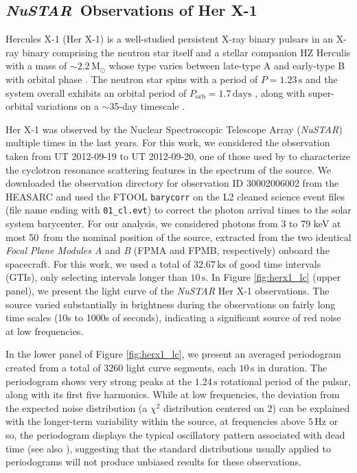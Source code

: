\documentclass[12pt]{emulateapj}
\newcommand{\project}[1]{\textsl{#1}}
\newcommand{\nustar}{\project{NuSTAR}\xspace}
\begin{document}
\subsection{\nustar\ Observations of Her X-1}

\begin{bf}
Hercules X-1 (Her X-1) is a well-studied persistent X-ray binary pulsars \citep{tananbaum1972} in an X-ray binary comprising the neutron star itself and a stellar companion HZ Herculis \citep{davidsen1972,forman1972,bahcall1972} with a mass of $\sim$$2.2 \,\mathrm{M}_\odot$ \citep{reynolds1997,leahy2014} whose type varies between late-type A and early-type B with orbital phase \citep{anderson1994,cheng1995} . The neutron star spins with a period of $P = 1.23\,\mathrm{s}$ \citep{tananbaum1972} and the system overall exhibits an orbital period of $P_\mathrm{orb} = 1.7\,\mathrm{days}$ \citep{bahcall1972}, along with super-orbital variations on a $\sim$35-day timescale \citep{giacconi1973,scott1999,igna2011}.

Her X-1 was observed by the Nuclear Spectroscopic Telescope Array (\nustar) multiple times in the last years. 
For this work, we considered the observation taken from UT 2012-09-19 to UT 2012-09-20, one of those used by \citet{fuerst13} to characterize the cyclotron resonance scattering features in the spectrum of the source.
We downloaded the observation directory for observation ID 30002006002 from the HEASARC and used the FTOOL \texttt{barycorr} on the L2 cleaned science event files (file name ending with \verb|01_cl.evt|) to correct the photon arrival times to the solar system barycenter.
For our analysis, we considered photons from 3 to 79 keV at most 50\arcsec\ from the nominal position of the source, extracted from the two identical \textit{Focal Plane Modules A} and \textit{B} (FPMA and FPMB, respectively) onboard the spacecraft.
For this work, we used a total of $32.67\,\mathrm{ks}$ of good time intervals (GTIs), only selecting intervals longer than $10\,\mathrm{s}$. In Figure \ref{fig:herx1_lc} (upper panel), we present the light curve of the \nustar Her X-1 observations. The source varied substantially in brightness during the observations on fairly long time scales (10s to 1000s of seconds), indicating a significant source of red noise at low frequencies.

In the lower panel of Figure \ref{fig:herx1_lc}, we present an averaged periodogram created from a total of $3260$ light curve segments, each $10\,\mathrm{s}$ in duration. The periodogram shows very strong peaks at the $1.24\,\mathrm{s}$ rotational period of the pulsar, along with its first five harmonics. While at low frequencies, the deviation from the expected noise distribution (a $\chi^2$ distribution centered on $2$) can be explained with the longer-term variability within the source, at frequencies above $5 \,\mathrm{Hz}$ or so, the periodogram displays the typical oscillatory pattern associated with dead time (see also \citealt{Bachetti+15}), suggesting that the standard distributions usually applied to periodograms will not produce unbiased results for these observations.


\end{bf}
\end{document}
